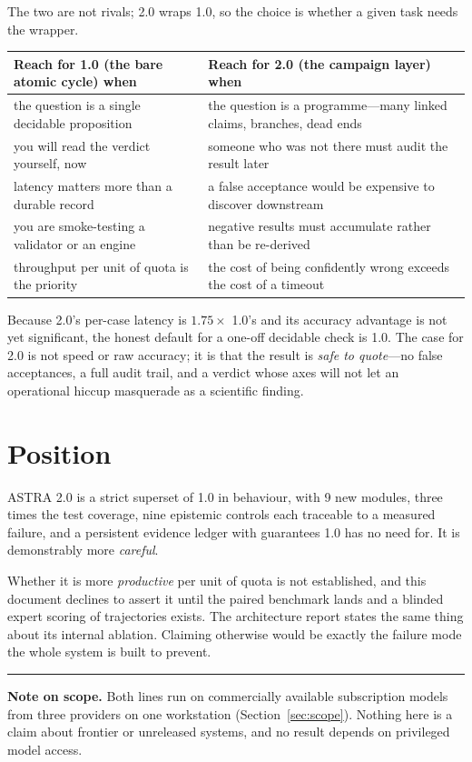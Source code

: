 \documentclass[11pt,a4paper]{article}
\begin{document}
The two are not rivals; 2.0 wraps 1.0, so the choice is whether a given task needs
the wrapper.

\begin{center}
\small
\begin{tabular}{@{}p{6.6cm}p{7.4cm}@{}}
\toprule
\textbf{Reach for 1.0 (the bare atomic cycle) when} & \textbf{Reach for 2.0 (the campaign layer) when} \\
\midrule
the question is a single decidable proposition &
the question is a programme---many linked claims, branches, dead ends \\
you will read the verdict yourself, now &
someone who was not there must audit the result later \\
latency matters more than a durable record &
a false acceptance would be expensive to discover downstream \\
you are smoke-testing a validator or an engine &
negative results must accumulate rather than be re-derived \\
throughput per unit of quota is the priority &
the cost of being confidently wrong exceeds the cost of a timeout \\
\bottomrule
\end{tabular}
\end{center}

\noindent Because 2.0's per-case latency is $1.75\times$ 1.0's and its accuracy
advantage is not yet significant, the honest default for a one-off decidable
check is 1.0. The case for 2.0 is not speed or raw accuracy; it is that the
result is \emph{safe to quote}---no false acceptances, a full audit trail, and a
verdict whose axes will not let an operational hiccup masquerade as a scientific
finding.

\section{Position}

ASTRA 2.0 is a strict superset of 1.0 in behaviour, with 9 new modules, three
times the test coverage, nine epistemic controls each traceable to a measured
failure, and a persistent evidence ledger with guarantees 1.0 has no need for.
It is demonstrably more \emph{careful}.

Whether it is more \emph{productive} per unit of quota is not established, and
this document declines to assert it until the paired benchmark lands and a
blinded expert scoring of trajectories exists. The architecture report states
the same thing about its internal ablation. Claiming otherwise would be exactly
the failure mode the whole system is built to prevent.

\vspace{4mm}
\hrule
\vspace{2mm}
\noindent\footnotesize
\textbf{Note on scope.} Both lines run on commercially available subscription
models from three providers on one workstation (Section~\ref{sec:scope}).
Nothing here is a claim about frontier or unreleased systems, and no result
depends on privileged model access.
\end{document}
